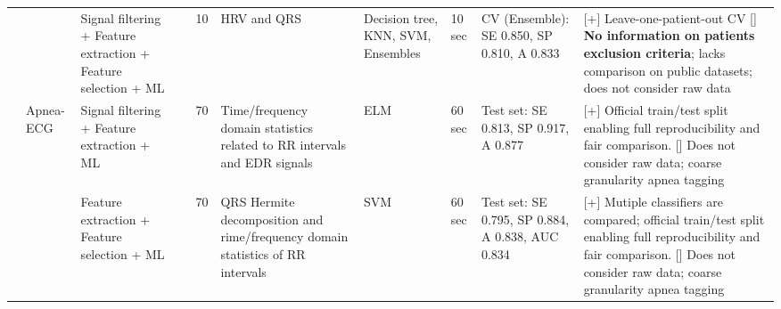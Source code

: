 \documentclass[5p,twocolumn,lefttitle]{elsarticle}
\begin{document}
\begin{table*}[!ht]
{\begin{tabularx}{2\textwidth}{@{}m{2.5em}p{7em}p{10em}lp{2em}p{12em}p{7em}p{3em}p{17em}X@{}}
                        \cmidrule(l){3-10} 
                            &                                                         &   Signal filtering + Feature extraction + Feature selection + ML                                          & \cite{bozkurt2020detection} & 10            & HRV and QRS                                                                                    & Decision tree, KNN, SVM, Ensembles                  & 10 sec                                     &  CV (Ensemble): SE 0.850, SP 0.810, A 0.833                                       & [+] Leave-one-patient-out CV [] \textbf{No information on patients exclusion criteria}; lacks comparison on public datasets; does not consider raw data     \\   
                            
                            
        \cmidrule(l){2-10} 
                            & \multirow{13}{*}{Apnea-ECG}                             & Signal filtering + Feature extraction + ML                     & \cite{DBLP:conf/cinc/SadrC14}            & 70            & Time/frequency domain statistics related to RR intervals and EDR signals                                          & ELM                                 & 60 sec                                     & Test set: SE 0.813, SP 0.917, A 0.877                                                                                                                                                   & [+] Official train/test split enabling full reproducibility and fair comparison. [] Does not consider raw data; coarse granularity apnea tagging                                                                                                                                                                                                                                                                                                    \\
                            \cmidrule(l){3-10} 
                            &                                                         & Feature extraction + Feature selection + ML                    & \cite{DBLP:journals/cbm/SharmaS16}       & 70            & QRS Hermite decomposition and rime/frequency domain statistics of RR intervals                                    & SVM                                 & 60 sec                                     & Test set: SE 0.795, SP 0.884, A 0.838, AUC 0.834                                                                                                                                         & [+] Mutiple classifiers are compared; official train/test split enabling full reproducibility and fair comparison. [] Does not consider raw data; coarse granularity apnea tagging                                                                                                                                                                                                                                                                  \\

\end{tabularx}}
\end{table*}
\end{document}
